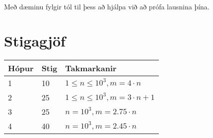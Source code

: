 Með dæminu fylgir tól til þess að hjálpa við að prófa lausnina þína.

\section*{Stigagjöf}
\begin{tabular}{|l|l|l|}
    \hline
    Hópur & Stig & Takmarkanir \\ \hline
    1     & 10   & $1 \leq n \leq 10^3, m = 4 \cdot n$ \\ \hline
    2     & 25   & $1 \leq n \leq 10^3, m = 3 \cdot n + 1$ \\ \hline
    3     & 25   & $n = 10^3, m = 2.75 \cdot n$ \\ \hline
    4     & 40   & $n = 10^3, m = 2.45 \cdot n$ \\ \hline
\end{tabular}
